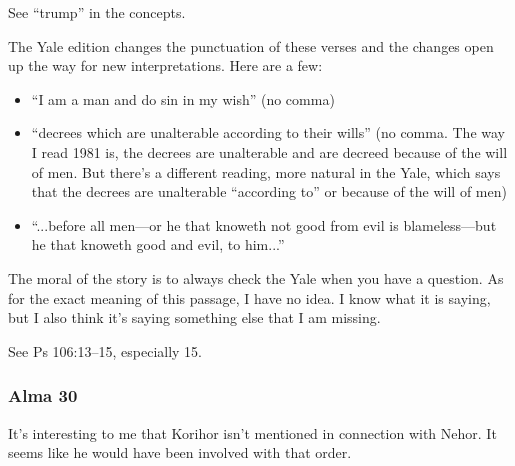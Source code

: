 		\begin{compactdesc}
		
		\item[1$\vert$]
		\begin{compactdesc}
		\item[trump of God] See ``trump'' in the concepts.
		\end{compactdesc}

		\item[3--5$\vert$]
		\begin{compactdesc}
		\item[Differences in Yale] The Yale edition changes the punctuation of these verses and the changes open up the way for new interpretations. Here are a few:
			\begin{itemize}
			\item ``I am a man and do sin in my wish'' (no comma)
			\item ``decrees which are unalterable according to their wills'' (no comma. The way I read 1981 is, the decrees are unalterable and are decreed because of the will of men. But there's a different reading, more natural in the Yale, which says that the decrees are unalterable ``according to'' or because of the will of men)
			\item ``...before all men---or he that knoweth not good from evil is blameless---but he that knoweth good and evil, to him...''
			\end{itemize}
		The moral of the story is to always check the Yale when you have a question. As for the exact meaning of this passage, I have no idea. I know what it is saying, but I also think it's saying something else that I am missing.
		\end{compactdesc}
		
		\item[5$\vert$]
		\begin{compactdesc}
		\item[to him it is given according to his desires] See Ps 106:13--15, especially 15.
		\end{compactdesc}

		\end{compactdesc}

	\subsubsection{Alma 30} %

	It's interesting to me that Korihor isn't mentioned in connection with Nehor. It seems like he would have been involved with that order.
	
